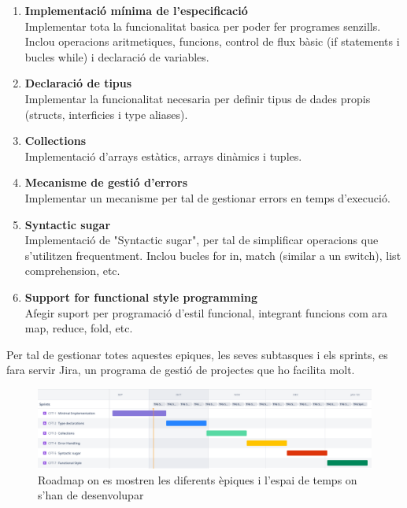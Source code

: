 ﻿\documentclass{article}
\begin{document}
\begin{enumerate}
    \item \textbf{Implementació mínima de l'especificació}\\
        Implementar tota la funcionalitat basica per poder fer programes senzills.
        Inclou operacions aritmetiques, funcions, control de flux bàsic (if 
        statements i bucles while) i declaració de variables.

    \item \textbf{Declaració de tipus} \\
        Implementar la funcionalitat necesaria per definir tipus de dades 
        propis (structs, interficies i type aliases).

    \item \textbf{Collections}\\
        Implementació d'arrays estàtics, arrays dinàmics i tuples.
    
    \item \textbf{Mecanisme de gestió d'errors}\\
        Implementar un mecanisme per tal de gestionar errors en temps d'execució.
    
    \item \textbf{Syntactic sugar}\\
        Implementació de "Syntactic sugar", per tal de simplificar operacions 
        que s'utilitzen frequentment. Inclou bucles for in, match (similar a un
        switch), list comprehension, etc.
    
    \item \textbf{Support for functional style programming}\\
        Afegir suport per programació d'estil funcional, integrant funcions com 
        ara map, reduce, fold, etc.
\end{enumerate}

Per tal de gestionar totes aquestes epiques, les seves subtasques i els sprints,
es fara servir Jira, un programa de gestió de projectes que ho facilita molt.

\begin{figure}
    \includegraphics[width=\linewidth]{roadmap}
    \caption{Roadmap on es mostren les diferents èpiques i l'espai de temps on s'han de desenvolupar}
\end{figure}
\end{document}
